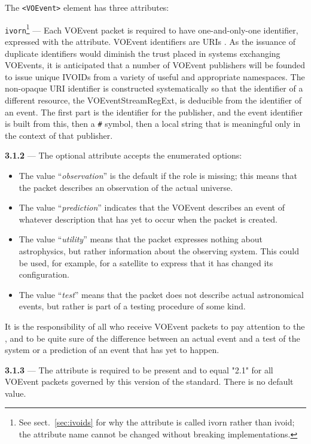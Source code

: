 \documentclass[11pt,a4paper]{ivoa}
\begin{document}
The \verb|<VOEvent>| element has three attributes:

 \texttt{ivorn}\footnote{See sect.~\ref{sec:ivoids}
for why the attribute is called ivorn rather than ivoid; the attribute
name cannot be changed without breaking implementations.} \label{sec:3.1.1} ---
Each VOEvent packet is required to have one-and-only-one identifier, expressed
with the  attribute. VOEvent identifiers are URIs
\citep{2016ivoa.spec.0523D}. As the issuance of duplicate identifiers would
diminish the trust placed in systems exchanging VOEvents, it is anticipated that
a number of VOEvent publishers will be founded to issue unique IVOIDs from a
variety of useful and appropriate namespaces. The non-opaque URI identifier is
constructed systematically so that the identifier of a different resource, the
VOEventStreamRegExt, is deducible from the identifier of an event. The first
part is the identifier for the publisher, and the event identifier is built
from this, then a \texttt{\#} symbol, then a local string that is meaningful only
in the context of that publisher.

\noindent \textbf{3.1.2}  \label{sec:3.1.2} ---
The optional  attribute accepts the enumerated options:
\begin{itemize}
\item The value ``\emph{observation}'' is the default if the role is missing;
this means that the packet describes an observation of the actual universe.
\item The value ``\emph{prediction}'' indicates that the VOEvent describes an
event of whatever description that has yet to occur when the packet is created.
\item The value ``\emph{utility}'' means that the packet expresses nothing about
astrophysics, but rather information about the observing system. This could be
used, for example, for a satellite to express that it has changed its
configuration.
\item The value ``\emph{test}'' means that the packet does not describe actual
astronomical events, but rather is part of a testing procedure of some kind.
\end{itemize}
It is the responsibility of all who receive VOEvent packets to pay attention to
the , and to be quite sure of the difference between an actual event
and a test of the system or a prediction of an event that has yet to happen.

\noindent \textbf{3.1.3}  \label{sec:3.1.3} ---
The  attribute is required to be present and to equal "2.1" for
all VOEvent packets governed by this version of the standard. There is no
default value.
\end{document}

